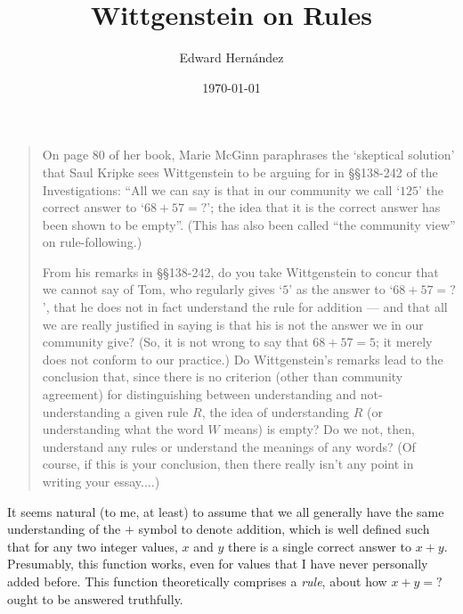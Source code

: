 \documentclass[man,12pt,natbib]{apa6}
\begin{document}
\title{Wittgenstein on Rules}
\author{Edward Hern\'{a}ndez}
\date{\today}

\maketitle

\begin{quote}
	On page 80 of her book, Marie McGinn paraphrases the `skeptical solution'
	that Saul Kripke sees Wittgenstein to be arguing for in \S\S 138-242 of the
	Investigations: ``All we can say is that in our community we call `$125$'
	the correct answer to `$68 + 57 = ?$'; the idea that it is the correct
	answer has been shown to be empty''. (This has also been called ``the
	community view'' on rule-following.)
	
	From his remarks in \S\S 138-242, do you take Wittgenstein to concur that
	we cannot say of Tom, who regularly gives `$5$' as the answer to `$68 + 57
	= ?$', that he does not in fact understand the rule for addition --- and
	that all we are really justified in saying is that his is not the answer we
	in our community give?  (So, it is not wrong to say that $68 + 57 = 5$; it
	merely does not conform to our practice.)  Do Wittgenstein's remarks lead
	to the conclusion that, since there is no criterion (other than community
	agreement) for distinguishing between understanding and not-understanding a
	given rule $R$, the idea of understanding $R$ (or understanding what the
	word $W$ means) is empty?  Do we not, then, understand any rules or
	understand the meanings of any words?  (Of course, if this is your
	conclusion, then there really isn't any point in writing your essay....)
\end{quote}
\clearpage

It seems natural (to me, at least) to assume that we all generally have the
same understanding of the $+$ symbol to denote addition, which is well defined
such that for any two integer values, $x$ and $y$ there is a single correct
answer to $x + y$. Presumably, this function works, even for values that I have
never personally added before. This function theoretically comprises a
\emph{rule}, about how $x + y = ?$ ought to be answered truthfully.
\end{document}
